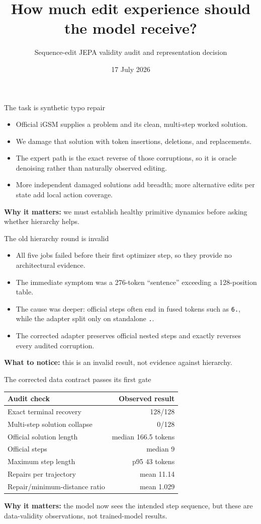 \documentclass[aspectratio=169]{beamer}
\title{How much edit experience should the model receive?}
\subtitle{Sequence-edit JEPA validity audit and representation decision}
\date{17 July 2026}
\begin{document}
\frame{\titlepage}

\begin{frame}{The task is synthetic typo repair}
  \begin{itemize}
    \item Official iGSM supplies a problem and its clean, multi-step worked solution.
    \item We damage that solution with token insertions, deletions, and replacements.
    \item The expert path is the exact reverse of those corruptions, so it is oracle denoising rather than naturally observed editing.
    \item More independent damaged solutions add breadth; more alternative edits per state add local action coverage.
  \end{itemize}
  \vfill
  \textbf{Why it matters:} we must establish healthy primitive dynamics before asking whether hierarchy helps.
\end{frame}

\begin{frame}{The old hierarchy round is invalid}
  \begin{itemize}
    \item All five jobs failed before their first optimizer step, so they provide no architectural evidence.
    \item The immediate symptom was a 276-token ``sentence'' exceeding a 128-position table.
    \item The cause was deeper: official steps often end in fused tokens such as \texttt{6.}, while the adapter split only on standalone \texttt{.}.
    \item The corrected adapter preserves official nested steps and exactly reverses every audited corruption.
  \end{itemize}
  \vfill
  \textbf{What to notice:} this is an invalid result, not evidence against hierarchy.
\end{frame}

\begin{frame}{The corrected data contract passes its first gate}
  \centering
  \begin{tabular}{lr}
    \toprule
    Audit check & Observed result \\
    \midrule
    Exact terminal recovery & 128/128 \\
    Multi-step solution collapse & 0/128 \\
    Official solution length & median 166.5 tokens \\
    Official steps & median 9 \\
    Maximum step length & p95 43 tokens \\
    Repairs per trajectory & mean 11.14 \\
    Repair/minimum-distance ratio & mean 1.029 \\
    \bottomrule
  \end{tabular}
  \vfill
  \textbf{Why it matters:} the model now sees the intended step sequence, but these are data-validity observations, not trained-model results.
\end{frame}
\end{document}
